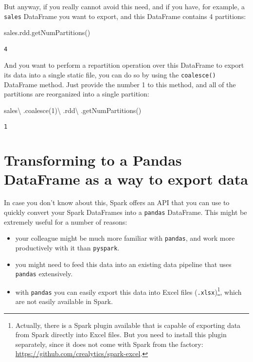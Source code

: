 \documentclass[
  11pt,
  letterpaper,
  DIV=11,
  numbers=noendperiod]{scrreprt}
\newenvironment{Shaded}{\begin{snugshade}}{\end{snugshade}}
\newcommand{\DecValTok}[1]{\textcolor[rgb]{0.68,0.00,0.00}{#1}}
\newcommand{\NormalTok}[1]{\textcolor[rgb]{0.00,0.23,0.31}{#1}}
\newcommand{\OperatorTok}[1]{\textcolor[rgb]{0.37,0.37,0.37}{#1}}
\providecommand{\tightlist}{%
  \setlength{\itemsep}{0pt}\setlength{\parskip}{0pt}}\usepackage{longtable,booktabs,array}
\begin{document}
But anyway, if you really cannot avoid this need, and if you have, for
example, a \texttt{sales} DataFrame you want to export, and this
DataFrame contains 4 partitions:

\begin{Shaded}
\begin{Highlighting}[]
\NormalTok{sales.rdd.getNumPartitions()}
\end{Highlighting}
\end{Shaded}

\begin{verbatim}
4
\end{verbatim}

And you want to perform a repartition operation over this DataFrame to
export its data into a single static file, you can do so by using the
\texttt{coalesce()} DataFrame method. Just provide the number 1 to this
method, and all of the partitions are reorganized into a single
partition:

\begin{Shaded}
\begin{Highlighting}[]
\NormalTok{sales}\OperatorTok{\textbackslash{}}
\NormalTok{    .coalesce(}\DecValTok{1}\NormalTok{)}\OperatorTok{\textbackslash{}}
\NormalTok{    .rdd}\OperatorTok{\textbackslash{}}
\NormalTok{    .getNumPartitions()}
\end{Highlighting}
\end{Shaded}

\begin{verbatim}
1
\end{verbatim}

\hypertarget{transforming-to-a-pandas-dataframe-as-a-way-to-export-data}{%
\section{Transforming to a Pandas DataFrame as a way to export
data}\label{transforming-to-a-pandas-dataframe-as-a-way-to-export-data}}

In case you don't know about this, Spark offers an API that you can use
to quickly convert your Spark DataFrames into a \texttt{pandas}
DataFrame. This might be extremely useful for a number of reasons:

\begin{itemize}
\tightlist
\item
  your colleague might be much more familiar with \texttt{pandas}, and
  work more productively with it than \texttt{pyspark}.
\item
  you might need to feed this data into an existing data pipeline that
  uses \texttt{pandas} extensively.
\item
  with \texttt{pandas} you can easily export this data into Excel files
  (\texttt{.xlsx})\footnote{Actually, there is a Spark plugin available
    that is capable of exporting data from Spark directly into Excel
    files. But you need to install this plugin separately, since it does
    not come with Spark from the factory:
    \url{https://github.com/crealytics/spark-excel}.}, which are not
  easily available in Spark.
\end{itemize}
\end{document}
